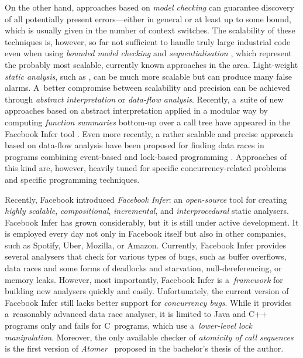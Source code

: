 \documentclass[runningheads]{llncs}
\begin{document}
On the other hand, approaches based on \emph{model checking} can guarantee
discovery of all potentially present errors---either in general or at least up
to some bound, which is usually given in the number of context switches.
%
The scalability of these techniques is, however, so far not sufficient to handle
truly large industrial code even when using \emph{bounded model checking} and
\emph{sequentialisation} \cite{lal-reps-08,abou-seq-11,lazy-seq-16}, which
represent the probably most scalable, currently known approaches in the area.
%
Light-weight \emph{static analysis}, such as \cite{racerx03}, can be much more
scalable but can produce many false alarms.
%
A~better compromise between scalability and precision can be achieved through
\emph{abstract interpretation} or \emph{data-flow analysis}.
%
Recently, a~suite of new approaches based on abstract interpretation applied in
a modular way by computing \emph{function summaries} bottom-up over a call tree
have appeared in the Facebook Infer tool \cite{racerD18,racerD19}.
%
Even more recently, a rather scalable and precise approach based on data-flow
analysis have been proposed for finding data races in programs combining
event-based and lock-based programming \cite{o2}.
%
Approaches of this kind are, however, heavily tuned for specific
concurrency-related problems and specific programming techniques.




Recently, Facebook introduced \emph{Facebook Infer}: an \emph{open-source} tool
for creating \emph{highly scalable}, \emph{compositional}, \emph{incremental},
and \emph{interprocedural} static analysers. Facebook Infer has grown
considerably, but it is still under active development. It is employed every day
not only in Facebook itself but also in other companies, such as Spotify, Uber,
Mozilla, or Amazon. Currently, Facebook Infer provides several analysers that
check for various types of bugs, such as buffer overflows, data races and some
forms of deadlocks and starvation, null-dereferencing, or memory leaks. However,
most importantly, Facebook Infer is a~\emph{framework} for building new
analysers quickly and easily. Unfortunately, the current version of Facebook
Infer still lacks better support for \emph{concurrency bugs}. While it provides
a~reasonably advanced data race analyser, it is limited to Java and C++ programs
only and fails for C~programs, which use a~\emph{lower-level lock manipulation}.
Moreover, the only available checker of \emph{atomicity of call sequences} is
the first version of \emph{Atomer}~\cite{harmimBP} proposed in the bachelor's
thesis of the author.
\end{document}
